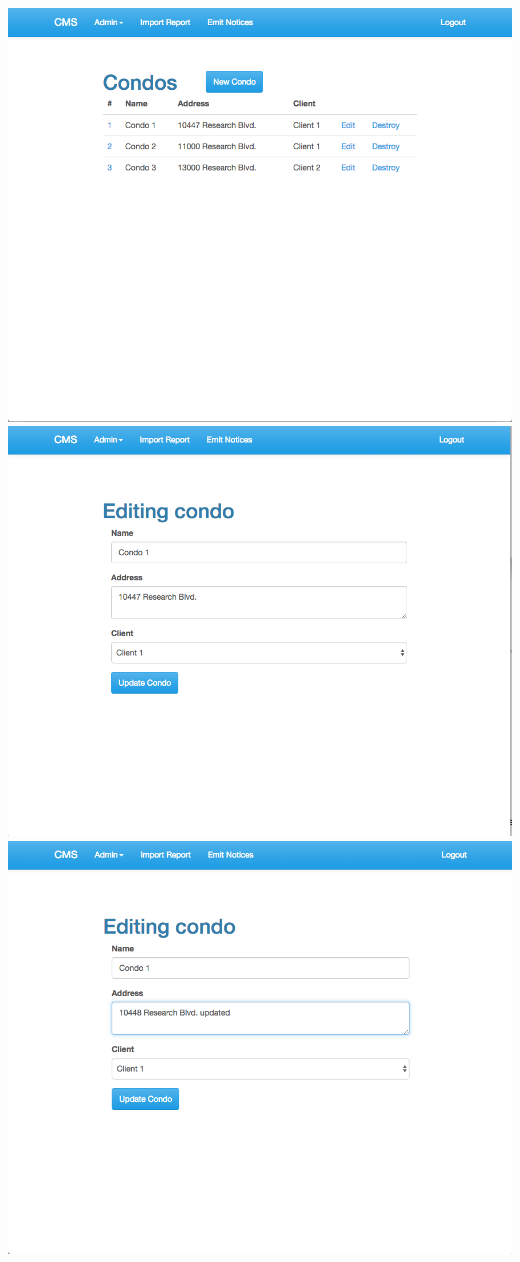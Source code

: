 \begin{itemize}
    \includegraphics[scale=0.25]{./images/ss/condo/edit/2.png}\\
    \includegraphics[scale=0.25]{./images/ss/condo/edit/3.png}
    \includegraphics[scale=0.25]{./images/ss/condo/edit/4.png}\\

\end{itemize}

